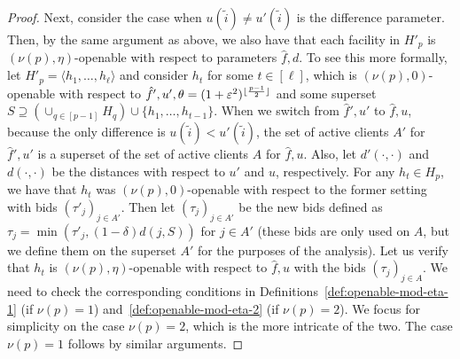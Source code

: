 \begin{proof}
Next, consider the case when $u(\tilde i) \neq u'(\tilde i)$ is the difference parameter.
Then, by the same argument as above, we also have that each facility in $H'_p$ is $(\nu(p),\eta)$-openable with respect to parameters $\hat f, d$.
To see this more formally, let $H'_p = \langle h_1, \dots, h_{\ell} \rangle$ and consider $h_t$ for some $t \in [\ell]$, which is $(\nu(p), 0)$-openable with respect to $\hat f', u', \theta = (1 + \varepsilon^2)^{\lfloor \frac{p - 1}{2} \rfloor}$ and some superset $S \supseteq (\cup_{q \in [p-1]} H_q) \cup \{ h_1, \dots, h_{t-1} \}$.
When we switch from $\hat f', u'$ to $\hat f, u$, because the only difference is $u(\tilde i) < u'(\tilde i)$, the set of active clients $A'$ for $\hat f', u'$ is a superset of the set of active clients $A$ for $\hat f, u$.
Also, let $d'(\cdot, \cdot)$ and $d(\cdot, \cdot)$ be the distances with respect to $u'$ and $u$, respectively. 
For any $h_t \in H_p$, we have that $h_t$ was $(\nu(p),0)$-openable with respect to the former setting with bids $(\tau'_j)_{j \in A'}$.
Then let $(\tau_j)_{j \in A'}$ be the new bids defined as $\tau_j = \min(\tau'_j, (1-\delta)d(j, S))$ for $j \in A'$ (these bids are only used on $A$, but we define them on the superset $A'$ for the purposes of the analysis). 
Let us verify that $h_t$ is $(\nu(p),\eta)$-openable with respect to $\hat f, u$ with the bids $(\tau_j)_{j \in A}$.
We need to check the corresponding conditions in Definitions~\ref{def:openable-mod-eta-1} (if $\nu(p)=1$) and~\ref{def:openable-mod-eta-2} (if $\nu(p)=2$).
We focus for simplicity on the case $\nu(p)=2$, which is the more intricate of the two.
The case $\nu(p)=1$ follows by similar arguments.


\end{proof}
